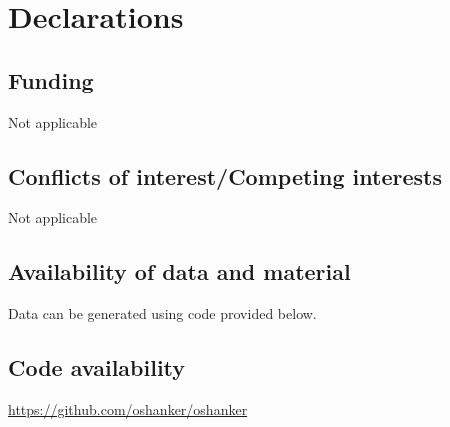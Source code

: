 \documentclass[twoside]{article}
\begin{document}
\section{\label{Declarations}Declarations}
\subsection{\label{Funding}Funding}
Not applicable
\subsection{\label{Conflicts}Conflicts of interest/Competing interests}
Not applicable
\subsection{\label{data}Availability of data and material}
Data can be generated using code provided below.
\subsection{\label{code}Code availability}
\url{https://github.com/oshanker/oshanker}
\end{document}
